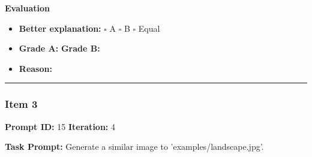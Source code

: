 \documentclass[11pt]{article}
\begin{document}
\vspace{1em}

\textbf{Evaluation}
\begin{itemize}
    \item \textbf{Better explanation:} \hspace{1em} $\square$ A \hspace{1em} $\square$ B \hspace{1em} $\square$ Equal
    \item \textbf{Grade A:} \underline{\hspace{2cm}} \hspace{1em} \textbf{Grade B:} \underline{\hspace{2cm}}
    \item \textbf{Reason:} \\[4.5em]
\end{itemize}

\vspace{1em}
\hrule
\vspace{1em}


\subsubsection*{Item 3}
\textbf{Prompt ID:} 15 \hfill \textbf{Iteration:} 4

\textbf{Task Prompt:} Generate a similar image to 'examples/landscape.jpg'.
\end{document}
